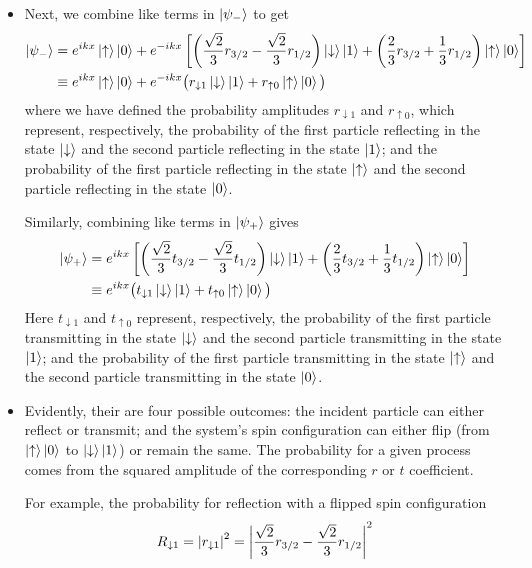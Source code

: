 \documentclass[11pt, a4paper]{article}
\newcommand{\ua}{\uparrow}  %
\newcommand{\da}{\downarrow}  %
\begin{document}
\begin{itemize}
	\item Next, we combine like terms in $ \ket{\psi_{-}} $ to get
	\begin{align*}
		\ket{\psi_{-}} &= e^{ikx}\ket{\ua}\ket{0} + e^{-ikx}\left[\left(\frac{\sqrt{2}}{3}r_{3/2} - \frac{\sqrt{2}}{3}r_{1/2}\right)\ket{\da}\ket{1} + \left(\frac{2}{3}r_{3/2} + \frac{1}{3}r_{1/2}\right)\ket{\ua}\ket{0}\right]\\
		&\equiv e^{ikx}\ket{\ua}\ket{0} + e^{-ikx}\big(r_{\da 1}\ket{\da}\ket{1} + r_{\ua 0}\ket{\ua}\ket{0}\big)
	\end{align*}
	where we have defined the probability amplitudes $ r_{\da 1} $ and $ r_{\ua 0} $, which represent, respectively, the probability of the first particle reflecting in the state $ \ket{\da} $ and the second particle reflecting in the state $ \ket{1} $; and the probability of the first particle reflecting in the state $ \ket{\ua} $ and the second particle reflecting in the state $ \ket{0} $. 
	
	
	Similarly, combining like terms in $ \ket{\psi_{+}} $ gives 
	\begin{align*}
		\ket{\psi_{+}} &= e^{ikx}\left[\left(\frac{\sqrt{2}}{3}t_{3/2} - \frac{\sqrt{2}}{3}t_{1/2}\right)\ket{\da}\ket{1} + \left(\frac{2}{3}t_{3/2} + \frac{1}{3}t_{1/2}\right)\ket{\ua}\ket{0}\right]\\
		& \equiv e^{ikx} \big( t_{\da 1}\ket{\da}\ket{1} + t_{\ua 0}\ket{\ua}\ket{0} \big)
	\end{align*}
	Here $ t_{\da 1} $ and $ t_{\ua 0} $ represent, respectively, the probability of the first particle transmitting in the state $ \ket{\da} $ and the second particle transmitting in the state $ \ket{1} $; and the probability of the first particle transmitting in the state $ \ket{\ua} $ and the second particle transmitting in the state $ \ket{0} $.
	
	\item Evidently, their are four possible outcomes: the incident particle can either reflect or transmit; and the system's spin configuration can either flip (from $ \ket{\ua}\ket{0} $ to $ \ket{\da}\ket{1} $) or remain the same. The probability for a given process comes from the squared amplitude of the corresponding $ r $ or $ t $ coefficient.
	
	For example, the probability for reflection with a flipped spin configuration
	\begin{equation*}
		R_{\da 1 } = \abs{r_{\da 1}}^{2} = \abs{\frac{\sqrt{2}}{3}r_{3/2} - \frac{\sqrt{2}}{3}r_{1/2} }^{2}
	\end{equation*}
	

\end{itemize}
\end{document}
